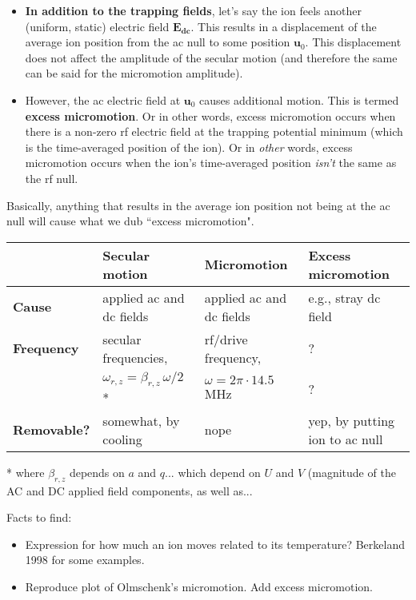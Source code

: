 \documentclass{article}
\begin{document}
\begin{itemize}
\item \textbf{In addition to the trapping fields}, let's say the ion feels another (uniform, static) electric field $\mathbf{E_{dc}}$. This results in a displacement of the average ion position from the ac null to some position $\mathbf{u}_0$. This displacement does not affect the amplitude of the secular motion (and therefore the same can be said for the micromotion amplitude).

\item However, the ac electric field at $\mathbf{u}_0$ causes additional motion. This is termed \textbf{excess micromotion}. Or in other words, excess micromotion occurs when there is a non-zero rf electric field at the trapping potential minimum (which is the time-averaged position of the ion). Or in \textit{other} words, excess micromotion occurs when the ion's time-averaged position \textit{isn't} the same as the rf null.
\end{itemize}

Basically, anything that results in the average ion position not being at the ac null will cause what we dub ``excess micromotion". 

\vspace{0mm}
\begin{center}
\begin{tabular}{l l l l} \toprule
& \textbf{Secular motion} & \textbf{Micromotion} & \textbf{Excess micromotion} \\ \midrule
\textbf{Cause} & applied ac and dc fields & applied ac and dc fields & e.g., stray dc field \\
\textbf{Frequency} & secular frequencies, & rf/drive frequency, & ? \\
 & $\omega_{r, z} = \beta_{r,z} \, \omega /2$ *&  $\omega = 2 \pi \cdot 14.5$ MHz & ? \\
\textbf{Removable?} & somewhat, by cooling & nope & yep, by putting ion to ac null \\
\bottomrule
\end{tabular}
\end{center}

\vspace{2mm}

* where $\beta_{r,z}$ depends on $a$ and $q$... which depend on $U$ and $V$ (magnitude of the AC and DC applied field components, as well as...


\vspace{5mm} \noindent Facts to find:

\begin{itemize}
\item Expression for how much an ion moves related to its temperature? Berkeland 1998 for some examples.
\item Reproduce plot of Olmschenk's micromotion. Add excess micromotion.
\end{itemize}
\end{document}
